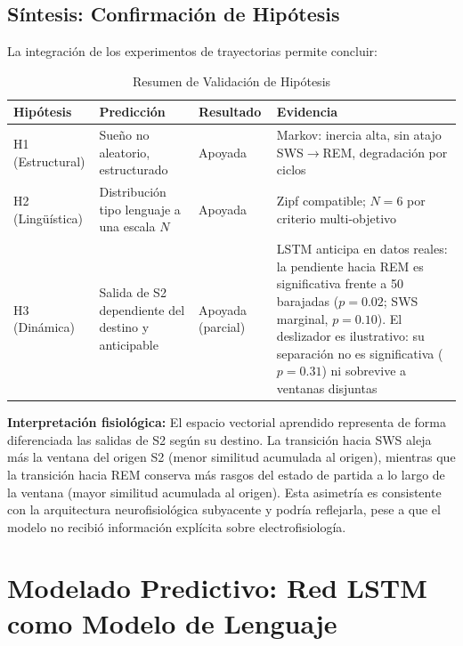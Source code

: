 \subsection{Síntesis: Confirmación de Hipótesis}

La integración de los experimentos de trayectorias permite concluir:

\begin{table}[htbp]
    \centering
    \caption{Resumen de Validación de Hipótesis}
    \label{tab:resumen_hipotesis}
    \small
    \setlength{\tabcolsep}{4pt}
    \renewcommand{\arraystretch}{1.3}
    \begin{tabular}{@{}>{\raggedright\arraybackslash}p{}>{\raggedright\arraybackslash}p{}>{\raggedright\arraybackslash}p{}>{\raggedright\arraybackslash}p{}@{}}
        \toprule
        \textbf{Hipótesis} & \textbf{Predicción} & \textbf{Resultado} & \textbf{Evidencia} \\
        \midrule
        H1 (Estructural) & Sueño no aleatorio, estructurado & Apoyada & Markov: inercia alta, sin atajo SWS$\rightarrow$REM, degradación por ciclos \\
        H2 (Lingüística) & Distribución tipo lenguaje a una escala $N$ & Apoyada & Zipf compatible; $N=6$ por criterio multi-objetivo \\
        H3 (Dinámica) & Salida de S2 dependiente del destino y anticipable & Apoyada (parcial) & LSTM anticipa en datos reales: la pendiente hacia REM es significativa frente a 50 barajadas ($p=0.02$; SWS marginal, $p=0.10$). El deslizador es ilustrativo: su separación no es significativa ($p=0.31$) ni sobrevive a ventanas disjuntas \\
        \bottomrule
    \end{tabular}
\end{table}

\textbf{Interpretación fisiológica:} El espacio vectorial aprendido representa de forma diferenciada las salidas de S2 según su destino. La transición hacia SWS aleja más la ventana del origen S2 (menor similitud acumulada al origen), mientras que la transición hacia REM conserva más rasgos del estado de partida a lo largo de la ventana (mayor similitud acumulada al origen). Esta asimetría es consistente con la arquitectura neurofisiológica subyacente y podría reflejarla, pese a que el modelo no recibió información explícita sobre electrofisiología.

\section{Modelado Predictivo: Red LSTM como Modelo de Lenguaje}
\label{sec:lstm}

